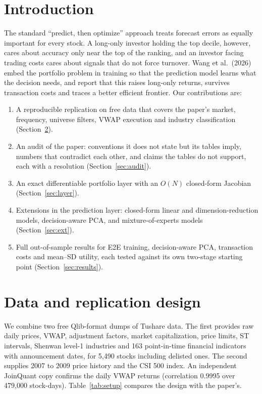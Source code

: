 \documentclass[10pt,a4paper]{article}
\begin{document}
\section{Introduction}
The standard ``predict, then optimize'' approach treats forecast errors as equally important for every stock. A
long-only investor holding the top decile, however, cares about accuracy only near the top of the ranking, and
an investor facing trading costs cares about signals that do not force turnover. Wang et al.\ (2026) embed the
portfolio problem in training so that the prediction model learns what the decision needs, and report that this
raises long-only returns, survives transaction costs and traces a better efficient frontier. Our contributions are:
\begin{enumerate}
\item A reproducible replication on free data that covers the paper's market, frequency, universe filters,
  VWAP execution and industry classification (Section~\ref{sec:data}).
\item An audit of the paper: conventions it does not state but its tables imply, numbers that contradict each
  other, and claims the tables do not support, each with a resolution (Section~\ref{sec:audit}).
\item An exact differentiable portfolio layer with an $O(N)$ closed-form Jacobian (Section~\ref{sec:layer}).
\item Extensions in the prediction layer: closed-form linear and dimension-reduction models, decision-aware
  PCA, and mixture-of-experts models (Section~\ref{sec:ext}).
\item Full out-of-sample results for E2E training, decision-aware PCA, transaction costs and mean--SD utility,
  each tested against its own two-stage starting point (Section~\ref{sec:results}).
\end{enumerate}

\section{Data and replication design}\label{sec:data}
We combine two free Qlib-format dumps of Tushare data. The first provides raw daily prices, VWAP, adjustment
factors, market capitalization, price limits, ST intervals, Shenwan level-1 industries and 163 point-in-time
financial indicators with announcement dates, for 5,490 stocks including delisted ones. The second supplies
2007 to 2009 price history and the CSI 500 index. An independent JoinQuant copy confirms the daily VWAP returns
(correlation 0.9995 over 479,000 stock-days). Table~\ref{tab:setup} compares the design with the paper's.
\end{document}
